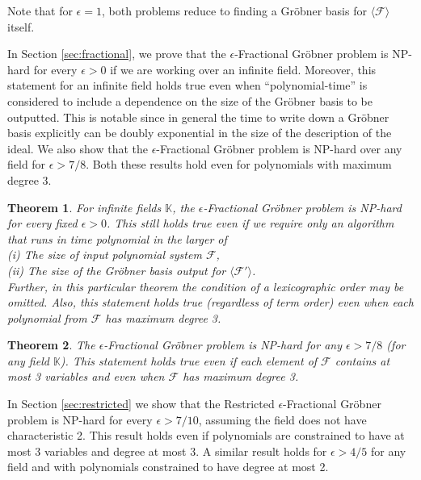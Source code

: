 \documentclass{article}
\newcommand{\F}[0]{\mathcal{F}}
\newcommand{\K}[0]{\mathbb{K}}
\newcommand{\ep}[0]{\epsilon}
\newtheorem{thm}{Theorem}
\begin{document}
\noindent Note that for $\ep=1$, both problems reduce to finding a Gr\"{o}bner basis for $\langle\F\rangle$ itself.

In Section \ref{sec:fractional}, we prove that the $\ep$\nobreakdash-Fractional Gr\"obner problem is NP-hard for every $\ep > 0$ if we are working over an infinite field.  Moreover, this statement for an infinite field holds true even when ``polynomial-time'' is considered to include a dependence on the size of the Gr\"obner basis to be outputted. This is notable since in general the time to write down a Gr\"obner basis explicitly can be doubly exponential in the size of the description of the ideal.  We also show that the $\ep$\nobreakdash-Fractional Gr\"{o}bner problem is NP-hard over any field for $\ep > 7/8$.  Both these results hold even for polynomials with maximum degree 3.



\begin{thm}\label{thm:main1}
For infinite fields $\K$, the $\ep$\nobreakdash-Fractional Gr\"obner problem is NP-hard for every fixed $\ep>0$. This still holds true even if we require only an algorithm that runs in time polynomial in the larger of\\
\hspace*{4mm}(i) The size of input polynomial system $\F$,\\
\hspace*{4mm}(ii) The size of the Gr\"{o}bner basis output for $\langle\F'\rangle$. \\ 
Further, in this particular theorem the condition of a lexicographic order may be omitted. Also, this statement holds true (regardless of term order) even when each polynomial from $\mathcal{F}$  has maximum degree 3.  \end{thm}

\begin{thm}\label{thm:main2}
The $\ep$\nobreakdash-Fractional Gr\"obner problem is NP-hard for any $\ep > 7/8$ (for any field $\K$). This statement holds true even if each element of $\F$ contains at most 3 variables and even when $\mathcal{F}$ has maximum degree 3.
\end{thm}



In Section \ref{sec:restricted} we show that the Restricted $\ep$\nobreakdash-Fractional Gr\"obner problem is NP-hard for every $\ep>7/10$, assuming the field does not have characteristic 2. This result holds even if polynomials are constrained to have at most 3 variables and degree at most 3. A similar result holds for $\ep>4/5$ for any field and with polynomials constrained to have degree at most 2.
\end{document}
